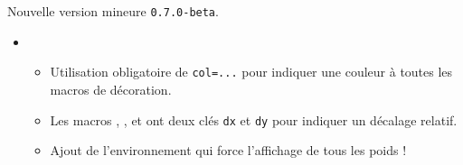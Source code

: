 Nouvelle version mineure \verb+0.7.0-beta+.

\begin{itemize}[itemsep=.5em]
    \item {}
    \begin{itemize}[itemsep=.5em]
        \item Utilisation obligatoire de \verb#col=...# pour indiquer une couleur à toutes les macros de décoration.
        
        \item Les macros , , 
               et 
              ont deux clés \verb#dx# et \verb#dy# pour indiquer un décalage relatif.
        
        \item Ajout de l'environnement  qui force l'affichage de tous les poids !
    \end{itemize}
\end{itemize}


\separation
